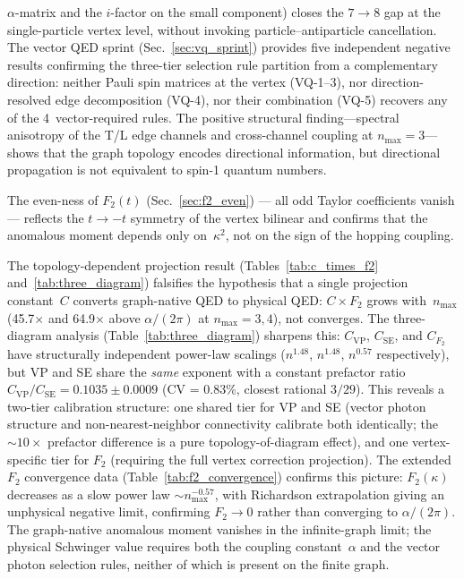 \documentclass[11pt]{article}
\begin{document}
$\alpha$-matrix and the $i$-factor on the small component) closes the
$7 \to 8$ gap at the single-particle vertex level, without invoking
particle--antiparticle cancellation.
The vector QED sprint (Sec.~\ref{sec:vq_sprint}) provides five
independent negative results confirming the three-tier selection rule
partition from a complementary direction: neither Pauli spin matrices at
the vertex (VQ-1--3), nor direction-resolved edge decomposition (VQ-4),
nor their combination (VQ-5) recovers any of the 4~vector-required
rules.  The positive structural finding---spectral anisotropy of the T/L
edge channels and cross-channel coupling at $n_{\max} = 3$---shows that
the graph topology encodes directional information, but directional
propagation is not equivalent to spin-1 quantum numbers.

The even-ness of $F_2(t)$
(Sec.~\ref{sec:f2_even}) --- all odd Taylor coefficients vanish --- reflects
the $t \to -t$ symmetry of the vertex bilinear and confirms that the
anomalous moment depends only on~$\kappa^2$, not on the sign of the
hopping coupling.

The topology-dependent projection result
(Tables~\ref{tab:c_times_f2} and~\ref{tab:three_diagram}) falsifies the
hypothesis that a single projection constant~$C$ converts graph-native
QED to physical QED: $C \times F_2$ grows with~$n_{\max}$
(45.7$\times$ and 64.9$\times$ above $\alpha/(2\pi)$ at
$n_{\max} = 3, 4$), not converges.  The three-diagram analysis
(Table~\ref{tab:three_diagram}) sharpens this: $C_{\mathrm{VP}}$,
$C_{\mathrm{SE}}$, and $C_{F_2}$ have structurally independent
power-law scalings ($n^{1.48}$, $n^{1.48}$, $n^{0.57}$ respectively),
but VP and SE share the \emph{same} exponent with a constant prefactor
ratio $C_{\mathrm{VP}}/C_{\mathrm{SE}} = 0.1035 \pm 0.0009$
(CV = 0.83\%, closest rational $3/29$).  This reveals a two-tier
calibration structure: one shared tier for VP and SE (vector photon
structure and non-nearest-neighbor connectivity calibrate both
identically; the ${\sim}10\times$ prefactor difference is a pure
topology-of-diagram effect), and one vertex-specific tier for $F_2$
(requiring the full vertex correction projection).
The extended $F_2$ convergence data
(Table~\ref{tab:f2_convergence}) confirms this picture: $F_2(\kappa)$
decreases as a slow power law $\sim n_{\max}^{-0.57}$, with Richardson
extrapolation giving an unphysical negative limit, confirming $F_2 \to
0$ rather than converging to $\alpha/(2\pi)$.  The graph-native
anomalous moment vanishes in the infinite-graph limit; the physical
Schwinger value requires both the coupling constant~$\alpha$ and the
vector photon selection rules, neither of which is present on the
finite graph.
\end{document}
